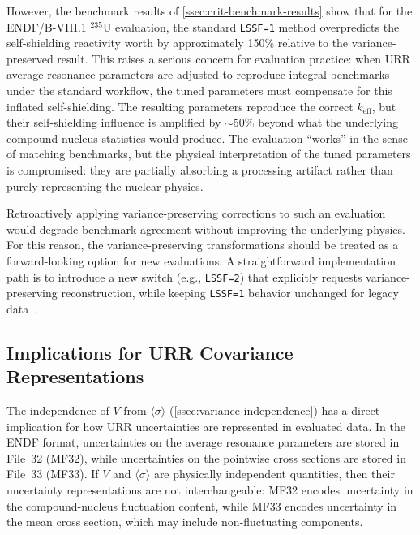 \documentclass{style/nseJournal}
\newcommand{\isotope}[2]{\ensuremath{^{#1}\mathrm{#2}}}
\newcommand{\sbin}{\langle \sigma \rangle}
\begin{document}
However, the benchmark results of \autoref{ssec:crit-benchmark-results} show that for the ENDF/B-VIII.1 \isotope{235}{U} evaluation, the standard \texttt{LSSF=1} method overpredicts the self-shielding reactivity worth by approximately 150\% relative to the variance-preserved result. This raises a serious concern for evaluation practice: when URR average resonance parameters are adjusted to reproduce integral benchmarks under the standard workflow, the tuned parameters must compensate for this inflated self-shielding. The resulting parameters reproduce the correct $k_{\text{eff}}$, but their self-shielding influence is amplified by $\sim$50\% beyond what the underlying compound-nucleus statistics would produce. The evaluation ``works'' in the sense of matching benchmarks, but the physical interpretation of the tuned parameters is compromised: they are partially absorbing a processing artifact rather than purely representing the nuclear physics.

Retroactively applying variance-preserving corrections to such an evaluation would degrade benchmark agreement without improving the underlying physics. For this reason, the variance-preserving transformations should be treated as a forward-looking option for new evaluations. A straightforward implementation path is to introduce a new switch (e.g., \texttt{LSSF=2}) that explicitly requests variance-preserving reconstruction, while keeping \texttt{LSSF=1} behavior unchanged for legacy data~\cite{wpec32,endf-manual}.

\subsection{Implications for URR Covariance Representations}
\label{ssec:covariance-implications}

The independence of $V$ from $\sbin$ (\autoref{ssec:variance-independence}) has a direct implication for how URR uncertainties are represented in evaluated data. In the ENDF format, uncertainties on the average resonance parameters are stored in File~32 (MF32), while uncertainties on the pointwise cross sections are stored in File~33 (MF33). If $V$ and $\sbin$ are physically independent quantities, then their uncertainty representations are not interchangeable: MF32 encodes uncertainty in the compound-nucleus fluctuation content, while MF33 encodes uncertainty in the mean cross section, which may include non-fluctuating components.
\end{document}
